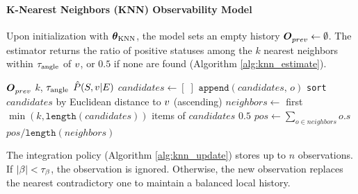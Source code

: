 \paragraph{K-Nearest Neighbors (KNN) Observability Model}

Upon initialization with \(\boldsymbol{\theta}_{\text{KNN}}\), the model sets an empty history \(\boldsymbol{O}^{}_{prev} \gets \emptyset\). The estimator returns the ratio of positive statuses among the \(k\) nearest neighbors within \(\tau_{\text{angle}}\) of \(v\), or \(0.5\) if none are found (Algorithm \ref{alg:knn_estimate}).

\begin{singlespace}
\begin{algorithm}[H]
    \caption[KNN Observability Estimation]{KNN $\estimate{\viewpoint}$}
    \label{alg:knn_estimate}
    \begin{algorithmic}
        \Require $\boldsymbol{O}^{}_{prev}$ 
        \Require $k$, $\tau_{\text{angle}}$
        \Ensure $\hat{P}(S,v|E)$
            \State $candidates \gets [\;]$
                    \State $\texttt{append}(candidates,\, o)$
                \EndIf
            \EndFor
            \State \texttt{sort} $candidates$ by Euclidean distance to $v$ (ascending)
            \State $neighbors \gets$ first $\min(k, \texttt{length}(candidates))$ items of $candidates$
                \State \Return $0.5$
            \EndIf
            \State $pos \gets \sum_{o \in neighbors} o.s$ 
            \State \Return $pos / \texttt{length}(neighbors)$
        \EndFunction
    \end{algorithmic}
\end{algorithm}
\end{singlespace}

The integration policy (Algorithm \ref{alg:knn_update}) stores up to \(n\) observations. If \(|\beta| < \tau_{\text{\ensuremath{\beta}}}\), the observation is ignored. Otherwise, the new observation replaces the nearest contradictory one to maintain a balanced local history.

